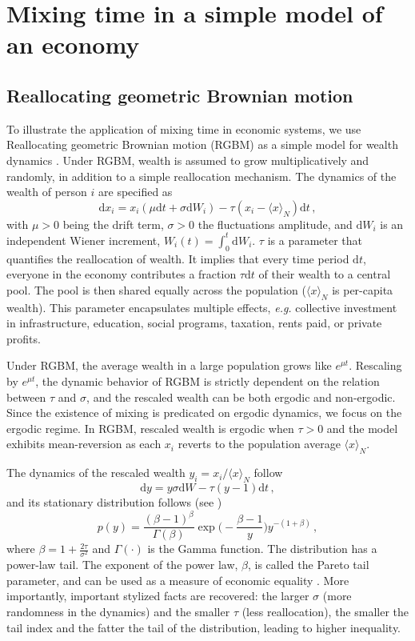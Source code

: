 \documentclass[11pt]{article}
\newcommand{\eg}{{\it e.g.}\xspace}
\newcommand{\be}{\begin{equation}}
\newcommand{\ee}{\end{equation}}
\numberwithin{equation}{section}
\begin{document}
\section{Mixing time in a simple model of an economy}\label{sec:rgbm}
\subsection{Reallocating geometric Brownian motion}

To illustrate the application of mixing time in economic systems, we use Reallocating geometric Brownian motion (RGBM) as a simple model for wealth dynamics \citep{BermanPetersAdamou2019}. Under RGBM, wealth is assumed to grow multiplicatively and randomly, in addition to a simple reallocation mechanism. The dynamics of the wealth of person $i$ are specified as
%
\be
\mathrm{d} x_i = x_i \left( \mu \mathrm{d}t + \sigma \mathrm{d}W_i \right) - \tau \left( x_i - \langle x \rangle_N \right) \mathrm{d}t\,,
\label{eq:rgbm}
\ee
%
with $\mu > 0$ being the drift term, $\sigma > 0$ the fluctuations amplitude, and $\mathrm{d}W_i$ is an independent Wiener increment, $W_i(t) =\int_0^t \mathrm{d}W_i$. $\tau$ is a parameter that quantifies the reallocation of wealth. It implies that every time period $\mathrm{d}t$, everyone in the economy contributes a fraction $\tau\mathrm{d}t$ of their wealth to a central pool. The pool is then shared equally across the population ($\langle x \rangle_N$ is per-capita wealth). This parameter encapsulates multiple effects, \eg collective investment in infrastructure, education, social programs, taxation, rents paid, or private profits.

Under RGBM, the average wealth in a large population grows like $e^{\mu t}$. Rescaling by $e^{\mu t}$, the dynamic behavior of RGBM is strictly dependent on the relation between $\tau$ and $\sigma$, and the rescaled wealth can be both ergodic and non-ergodic. Since the existence of mixing is predicated on ergodic dynamics, we focus on the ergodic regime. In RGBM, rescaled wealth is ergodic when $\tau > 0$
and the model exhibits mean-reversion as each $x_i$ reverts to the population average $\langle x \rangle_N$.

The dynamics of the rescaled wealth $y_i = x_i / \langle x \rangle_N$ follow
%
\be
    \mathrm{d} y =   y \sigma  \mathrm{d} W - \tau (y - 1)  \mathrm{d}t\,,
    \label{eq:rescaled-rgbm}
\ee
%
and its stationary distribution follows (see \citep{BermanPetersAdamou2019})
%
\be
p(y) = \frac{(\beta - 1)^{\beta}}{\Gamma(\beta)} \exp{\big(-\frac{\beta - 1}{y}\big)} y^{-(1+\beta)}\,,
\label{eq:rgbm-stationary-distribution}
\ee
%
where $\beta = 1 + \frac{2 \tau}{\sigma^2}$ and $\Gamma(\cdot)$ is the Gamma function. The distribution has a power-law tail. The exponent of the power law, $\beta$, is called the Pareto tail parameter, and can be used as a measure of economic equality \citep{Cowell2011}. More importantly, important stylized facts are recovered: the larger $\sigma$ (more randomness in the dynamics) and the smaller $\tau$ (less reallocation), the smaller the tail index and the fatter the tail of the distribution, leading to higher inequality.
\end{document}

